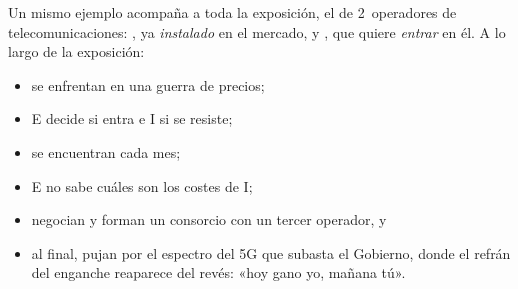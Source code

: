 \documentclass[11pt]{article}
\begin{document}
\begin{itemize}
\begin{itemize}
  Un mismo ejemplo acompaña a toda la exposición, el de 2~operadores de telecomunicaciones: , ya \emph{instalado} en el mercado, y , que quiere \emph{entrar} en él. A lo largo de la exposición:
  \begin{itemize}
  \item se enfrentan en una guerra de precios;
  \item E decide si entra e I si se resiste;
  \item se encuentran cada mes;
  \item E no sabe cuáles son los costes de \textup{I};
  \item negocian y forman un consorcio con un tercer operador, y
  \item al final, pujan por el espectro del 5G que subasta el Gobierno, donde el refrán del enganche reaparece del revés: «hoy gano yo, mañana tú».
  \end{itemize}
  \end{itemize}
\end{itemize}
\end{document}
